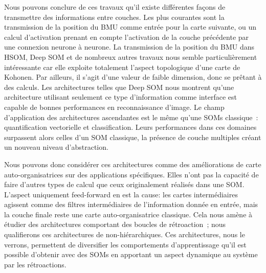 \documentclass[../main]{subfiles}
\begin{document}
Nous pouvons conclure de ces travaux qu'il existe différentes façons de transmettre des informations entre couches. Les plus courantes sont la transmission de la position du BMU comme entrée pour la carte suivante, ou un calcul d'activation prenant en compte l'activation de la couche précédente par une connexion neurone à neurone.
La transmission de la position du BMU dans HSOM, Deep SOM et de nombreux autres travaux nous semble particulièrement intéressante car elle exploite totalement l'aspect topologique d'une carte de Kohonen. Par ailleurs, il s'agit d'une valeur de faible dimension, donc se prêtant à des calculs. Les architectures telles que Deep SOM nous montrent qu'une architecture utilisant seulement ce type d'information comme interface est capable de bonnes performances en reconnaissance d'image.
Le champ d'application des architectures ascendantes est le même qu'une SOMs classique~: quantification vectorielle et classification. Leurs performances dans ces domaines surpassent alors celles d'un SOM classique, la présence de couche multiples créant un nouveau niveau d'abstraction.

Nous pouvons donc considérer ces architectures comme des améliorations de carte auto-organisatrices sur des applications spécifiques. Elles n'ont pas la capacité de faire d'autres types de calcul que ceux originalement réalisés dans une SOM.
L'aspect uniquement feed-forward en est la cause: les cartes intermédiaires agissent comme des filtres intermédiaires de l'information donnée en entrée, mais la couche finale reste une carte auto-organisatrice classique.
Cela nous amène à étudier des architectures comportant des boucles de rétroaction~; nous qualifierons ces architectures de non-hiérarchiques. Ces architectures, nous le verrons, permettent de diversifier les comportements d'apprentissage qu'il est possible d'obtenir avec des SOMs en apportant un aspect dynamique au système par les rétroactions.

\end{document}
